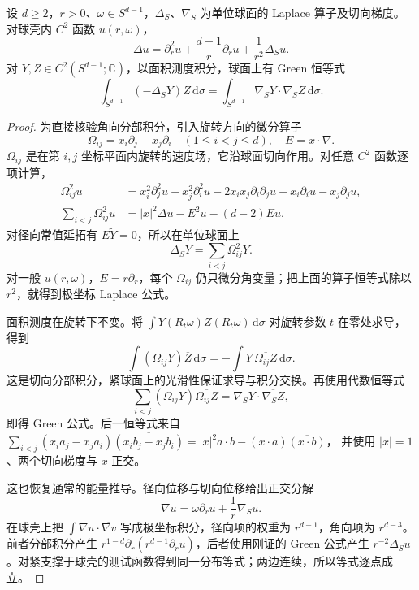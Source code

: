 \begin{proposition}
\label{b2:prop:B2-polar-laplacian}
设 \(d\geq2\)，\(r>0\)、\(\omega\in S^{d-1}\)，\(\Delta_S\)、\(\nabla_S\) 为单位球面的 Laplace 算子及切向梯度。对球壳内 \(C^2\) 函数 \(u(r,\omega)\)，
\[\Delta u=\partial_r^2u+\frac{d-1}r\partial_ru+\frac1{r^2}\Delta_Su.
\]
对 \(Y,Z\in C^2(S^{d-1};\mathbb C)\)，以面积测度积分，球面上有 Green 恒等式
\[\int_{S^{d-1}}(-\Delta_SY)\overline Z\,\mathrm d\sigma
 =\int_{S^{d-1}}\nabla_SY\cdot\overline{\nabla_SZ}\,\mathrm d\sigma.
\]
\end{proposition}
\begin{proof}
为直接核验角向分部积分，引入旋转方向的微分算子
\[
 \Omega_{ij}=x_i\partial_j-x_j\partial_i
 \quad(1\leq i<j\leq d),
 \quad E=x\cdot\nabla.
\]
\(\Omega_{ij}\) 是在第 \(i,j\) 坐标平面内旋转的速度场，它沿球面切向作用。对任意 \(C^2\) 函数逐项计算，
\[
 \begin{aligned}
 \Omega_{ij}^2u
 &=x_i^2\partial_j^2u+x_j^2\partial_i^2u
       -2x_ix_j\partial_i\partial_ju
       -x_i\partial_iu-x_j\partial_ju,\\
 \sum_{i<j}\Omega_{ij}^2u
 &=|x|^2\Delta u-E^2u-(d-2)Eu.
 \end{aligned}
\]
对径向常值延拓有 \(E\widetilde Y=0\)，所以在单位球面上
\[
 \Delta_SY=\sum_{i<j}\Omega_{ij}^2Y.
\]
对一般 \(u(r,\omega)\)，\(E=r\partial_r\)，每个 \(\Omega_{ij}\) 仍只微分角变量；把上面的算子恒等式除以 \(r^2\)，就得到极坐标 Laplace 公式。

面积测度在旋转下不变。将
\(\int Y(R_t\omega)\overline{Z(R_t\omega)}\,\mathrm d\sigma\)
对旋转参数 \(t\) 在零处求导，得到
\[
 \int(\Omega_{ij}Y)\overline Z\,\mathrm d\sigma
       =-\int Y\,\overline{\Omega_{ij}Z}\,\mathrm d\sigma.
\]
这是切向分部积分，紧球面上的光滑性保证求导与积分交换。再使用代数恒等式
\[
 \sum_{i<j}(\Omega_{ij}Y)\overline{\Omega_{ij}Z}
       =\nabla_SY\cdot\overline{\nabla_SZ},
\]
即得 Green 公式。后一恒等式来自
\(\sum_{i<j}(x_ia_j-x_ja_i)\overline{(x_ib_j-x_jb_i)}
=|x|^2a\cdot\overline b-(x\cdot a)\overline{(x\cdot b)}\)，
并使用 \(|x|=1\)、两个切向梯度与 \(x\) 正交。

这也恢复通常的能量推导。径向位移与切向位移给出正交分解
\[
 \nabla u=\omega\partial_ru+\frac1r\nabla_Su.
\]
在球壳上把 \(\int\nabla u\cdot\overline{\nabla v}\) 写成极坐标积分，径向项的权重为 \(r^{d-1}\)，角向项为 \(r^{d-3}\)。前者分部积分产生
\(r^{1-d}\partial_r(r^{d-1}\partial_ru)\)，后者使用刚证的 Green 公式产生 \(r^{-2}\Delta_Su\)。对紧支撑于球壳的测试函数得到同一分布等式；两边连续，所以等式逐点成立。
\end{proof}

